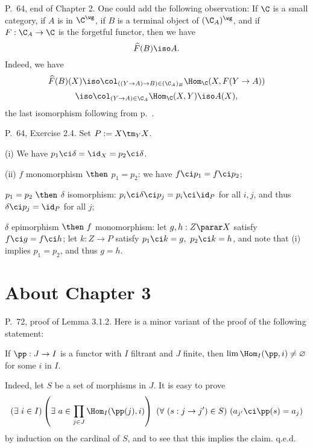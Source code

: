 \documentclass[12pt]{article}
\theoremstyle{remark}
\theoremstyle{definition}
\begin{document}
%

\begin{s}
P.~64, end of Chapter 2. One could add the following observation: If $\C$ is a small category, if $A$ is in $\C^\wg$, if $B$ is a terminal object of $(\C_A)^\wg$, and if $F:\C_A\to\C$ is the forgetful functor, then we have 
$$
\widehat F(B)\iso A.
$$ 
Indeed, we have 
$$
\widehat F(B)(X)\iso\col_{((Y\to A)\to B)\in(\C_A)_B}\Hom_\C(X,F(Y\to A))
$$
$$
\iso\col_{(Y\to A)\in\C_A}\Hom_\C(X,Y)\iso A(X),
$$ 
the last isomorphism following from  p.~. 
\end{s}

%

\begin{s}
P.~64, Exercise 2.4. Set $P:=X\tm_YX$.

\nn(i) We have $p_1\ci\delta=\id_X=p_2\ci\delta$.

\nn(ii) $f$ monomorphism $\then$ $p_1=p_2$: we have $f\ci p_1=f\ci p_2$;

\nn$p_1=p_2\ \then$ $\delta$ isomorphism: $p_i\ci\delta\ci p_j=p_i\ci\id_P$ for all $i,j$, and thus $\delta\ci p_j=\id_P$ for all $j$;

\nn$\delta$ epimorphism $\then\ f$ monomorphism: let $g,h:Z\parar X$ satisfy $f\ci g=f\ci h$; let $k:Z\to P$ satisfy $p_1\ci k=g,\ p_2\ci k=h$, and note that (i) implies $p_1=p_2$, and thus $g=h$.
\end{s}


\section{About Chapter 3}


\begin{s} 
P.~72, proof of Lemma 3.1.2. Here is a minor variant of the proof of the following statement: 

If $\pp:J\to I$ is a functor with $I$ filtrant and $J$ finite, then $\lim\Hom_I(\pp,i)\neq\varnothing$ for some $i$ in $I$. 

Indeed, let $S$ be a set of morphisms in $J$. It is easy to prove 
$$
(\exists\ i\in I)\left(\exists\ a\in\prod_{j\in J}\Hom_I(\pp(j),i)\right)\ (\forall\ (s:j\to j')\in S)\ (a_{j'}\ci\pp(s)=a_j) 
$$ 
by induction on the cardinal of $S$, and to see that this implies the claim. q.e.d.
\end{s}

%
\end{document}
